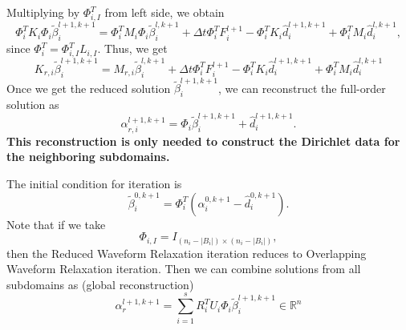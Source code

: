 \documentclass[a4paper, 11pt]{article}
\theoremstyle{plain}
\theoremstyle{definition}
\theoremstyle{remark}
\begin{document}
Multiplying by $\Phi_{i, I}^{T}$ from left side, we obtain
\begin{equation*}
    \Phi_{i}^{T}K_{i}\Phi_{i} \tilde{\beta}_{i}^{l+1, k+1} = \Phi_{i}^{T}M_{i}\Phi_{i}\tilde{\beta}_{i}^{l, k+1} + 
    \Delta t\Phi_{i}^{T} F_{i}^{l+1} - \Phi_{i}^{T}K_{i}\hat{d}^{l+1, k+1}_{i} + \Phi_{i}^{T}M_{i} \hat{d}_{i}^{l, k+1},
\end{equation*}
since $\Phi_{i}^{T} = \Phi_{i, I}^{T}L_{i, I}$. Thus, we get
\begin{equation*}
    \boxed{K_{r, i} \tilde{\beta}_{i}^{l+1, k+1} = M_{r, i}\tilde{\beta}_{i}^{l, k+1} + 
    \Delta t\Phi_{i}^{T} F_{i}^{l+1} - \Phi_{i}^{T}K_{i}\hat{d}^{l+1, k+1}_{i} + \Phi_{i}^{T}M_{i} \hat{d}_{i}^{l, k+1}}
\end{equation*}
Once we get the reduced solution $\tilde{\beta}_{i}^{l+1, k+1}$, we can reconstruct the full-order solution as
\begin{equation*}
    \boxed{\alpha_{r, i}^{l+1, k+1} = \Phi_{i}\tilde{\beta}_{i}^{l+1, k+1} + \hat{d}_{i}^{l+1, k+1}}.
\end{equation*}
\textbf{This reconstruction is only needed to construct the Dirichlet data for the neighboring subdomains.}

\noindent The initial condition for iteration is 
\begin{equation*}
    \tilde{\beta}_{i}^{0, k + 1} = \Phi_{i}^{T}\left(\alpha_{i}^{0, k + 1} - \hat{d}_{i}^{0, k + 1}\right).
\end{equation*}
Note that if we take
\begin{equation*}
    \Phi_{i, I} = I_{(n_{i} - |B_{i}|)\times (n_{i} - |B_{i}|)},
\end{equation*}
then the Reduced Waveform Relaxation iteration reduces to Overlapping Waveform Relaxation iteration. Then we can combine solutions from
all subdomains as (global reconstruction)
\begin{equation*}
    \boxed{\alpha_{r}^{l+1, k+1} = \sum_{i=1}^{s}R_{i}^{T}U_{i}\Phi_{i}\tilde{\beta}_{i}^{l+1, k+1} \in \mathbb{R}^{n}}
\end{equation*}
\end{document}

